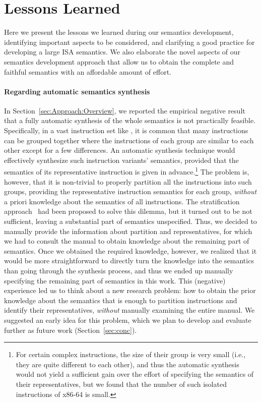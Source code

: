 \section{Lessons Learned}
\label{sec:lesson-learned}

{\color{blue}

Here we present the lessons we learned during our semantics development, identifying important aspects to be considered, and clarifying a good practice for developing a large ISA semantics.
We also elaborate the novel aspects of our semantics development approach that allow us to obtain the complete and faithful semantics with an affordable amount of effort.

\paragraph{Regarding automatic semantics synthesis}

In Section~\ref{sec:Approach:Overview}, we reported the empirical negative result that a fully automatic synthesis of the whole \ISA semantics is not practically feasible.
Specifically, in a vast instruction set like \ISA {}, it is common that many instructions can be grouped together where the instructions of each group are similar to each other except for a few differences.
An automatic synthesis technique would effectively synthesize such instruction variants' semantics, provided that the semantics of its representative instruction is given in advance.\footnote{%
For certain complex instructions, the size of their group is very small (i.e., they are quite different to each other), and thus the automatic synthesis would not yield a sufficient gain over the effort of specifying the semantics of their representatives, but we found that the number of such isolated instructions of x86-64 is small.}
The problem is, however, that it is non-trivial to properly partition all the instructions into such groups, providing the representative instruction semantics for each group, \emph{without} a priori knowledge about the semantics of all instructions.
The stratification approach~\cite{Heule2016a} had been proposed to solve this dilemma, but it turned out to be not sufficient, leaving a substantial part of semantics unspecified.
Thus, we decided to manually provide the information about partition and representatives, for which we had to consult the manual to obtain knowledge about the remaining part of semantics.
Once we obtained the required knowledge, however, we realized that it would be more straightforward to directly turn the knowledge into the semantics than going through the synthesis process, and thus we ended up manually specifying the remaining part of semantics in this work.
%
This (negative) experience led us to think about a new research problem: how to obtain the prior knowledge about the semantics that is enough to partition instructions and identify their representatives, \emph{without} manually examining the entire manual.
We suggested an early idea for this problem, which we plan to develop and evaluate further as future work (Section~\ref{sec:conc}).

}

